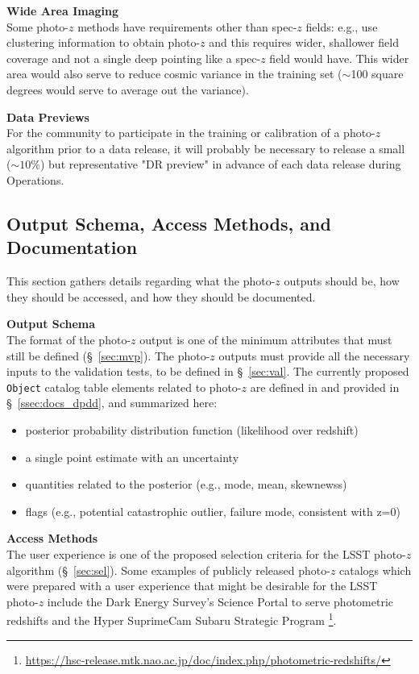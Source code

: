 \documentclass[DM,lsstdraft,toc]{lsstdoc}
\begin{document}
{\bf Wide Area Imaging}\\
Some photo-$z$ methods have requirements other than spec-$z$ fields: e.g., \citet{2019MNRAS.483.2801S} use clustering information to obtain photo-$z$ and this requires wider, shallower field coverage and not a single deep pointing like a spec-$z$ field would have. 
This wider area would also serve to reduce cosmic variance in the training set ($\sim$100 square degrees would serve to average out the variance).

{\bf Data Previews}\\
For the community to participate in the training or calibration of a photo-$z$ algorithm prior to a data release, it will probably be necessary to release a small ($\sim10\%$) but representative "DR preview" in advance of each data release during Operations.


\subsection{Output Schema, Access Methods, and Documentation}\label{ssec:dp_pz}

This section gathers details regarding what the photo-$z$ outputs should be, how they should be accessed, and how they should be documented.

{\bf Output Schema}\\
The format of the photo-$z$ output is one of the minimum attributes that must still be defined (\S~\ref{sec:mvp}). 
The photo-$z$ outputs must provide all the necessary inputs to the validation tests, to be defined in \S~\ref{sec:val}.
The currently proposed {\tt Object} catalog table elements related to photo-$z$ are defined in  and provided in \S~\ref{ssec:docs_dpdd}, and summarized here:
\vspace{-15pt}
\begin{itemize}
\item posterior probability distribution function (likelihood over redshift)
\item a single point estimate with an uncertainty
\item quantities related to the posterior (e.g., mode, mean, skewnewss)
\item flags (e.g., potential catastrophic outlier, failure mode, consistent with z=0)
\end{itemize}

{\bf Access Methods}\\
The user experience is one of the proposed selection criteria for the LSST photo-$z$ algorithm (\S~\ref{sec:sel}). 
Some examples of publicly released photo-$z$ catalogs which were prepared with a user experience that might be desirable for the LSST photo-$z$ include the Dark Energy Survey's Science Portal to serve photometric redshifts \cite{2018A&C....25...58G} and the Hyper SuprimeCam Subaru Strategic Program \cite{2018PASJ...70S...9T}\footnote{\url{https://hsc-release.mtk.nao.ac.jp/doc/index.php/photometric-redshifts/}}.
\end{document}

